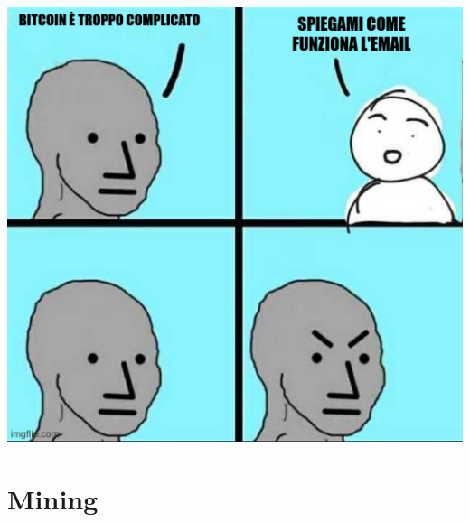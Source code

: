 \documentclass{beamer}
\begin{document}
\begin{frame}{\insertsection}
    \centering
    \includegraphics[height=.8\textheight]{images/bitcoin-is-simple-it.jpeg}
\end{frame}

\section{Mining}

\end{document}
